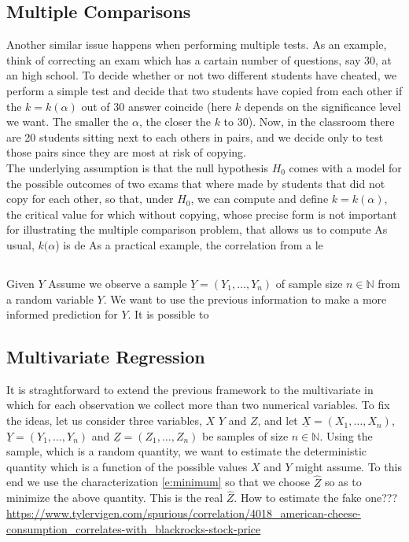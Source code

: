 	\subsection{Multiple Comparisons}

	Another similar issue happens when performing multiple tests. As an example, think of correcting an exam which  has a cartain number of questions, say 30, at an high school. To decide whether or not two different students have cheated, we perform a simple test and decide that two students have copied from each other if the $k = k(\alpha)$  out of 30 answer coincide (here $k$ depends on the significance level we want. The smaller the $\alpha$, the closer the $k$ to 30). Now, in the classroom there are 20 students sitting next to each others in pairs, and we decide only to test those pairs since they are most at risk of copying. \\
	The underlying assumption is that the null hypothesis $H_0$ comes with a model for the possible outcomes of two exams that where made by students that did not copy for each other, so that, under $H_0$, we can compute 
	and define $k = k(\alpha)$, the critical value for which without copying, whose precise form is not important for illustrating the multiple comparison problem, that allows us to compute As usual, $k(\alpha$) is de 
	As a practical example, the correlation from a le
	
	\subsection{ }
	Given $Y$ 
	Assume we observe a sample $\underline Y = (Y_1, \ldots, Y_n)$ of sample size $n \in \mathbb N$ from a random variable $Y$. We want to use the previous information to make a more informed prediction for $Y$. It is possible to  
      
	\subsection{ Multivariate Regression} 
		It is straghtforward to extend the previous framework to the multivariate in which for each observation we collect more than two numerical variables. To fix the ideas, let us consider three variables, $X$ $Y$ and $Z$, and let $\underline X = (X_1, \ldots, X_n)$, $\underline Y =(Y_1, \ldots, Y_n)$ and $\underline Z = (Z_1, \ldots, Z_n)$ be samples of size $n \in \mathbb N$. Using the sample, which is a random quantity, we want to estimate the deterministic quantity   
	which is a function of the possible values $X$ and $Y$ might assume. To this end we use the characterization \eqref{e:minimum}
	so that we choose $\hat Z$ so as to minimize the above quantity. This is the real $\hat Z$. How to estimate the fake one???
	\url{https://www.tylervigen.com/spurious/correlation/4018_american-cheese-consumption_correlates-with_blackrocks-stock-price}
